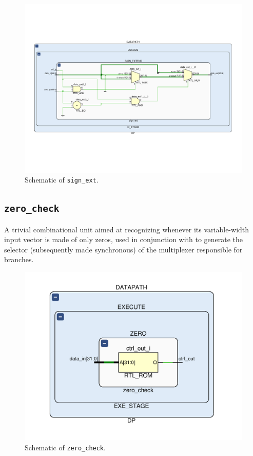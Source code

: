 \begin{figure}[!ht]
\centering
\includegraphics[width=\textwidth]{./chapters/figures/sign_ext.pdf} 
\caption{Schematic of \texttt{sign\_ext}.}
\end{figure}

\subsection{\texttt{zero\_check}}
A trivial combinational unit aimed at recognizing whenever its variable-width input vector is made of only zeros, used in conjunction with  to generate the selector (subsequently made synchronous) of the multiplexer responsible for branches.

\begin{figure}[!ht]
\centering
\includegraphics[width=\textwidth]{./chapters/figures/zero_check.pdf} 
\caption{Schematic of \texttt{zero\_check}.}
\end{figure}

